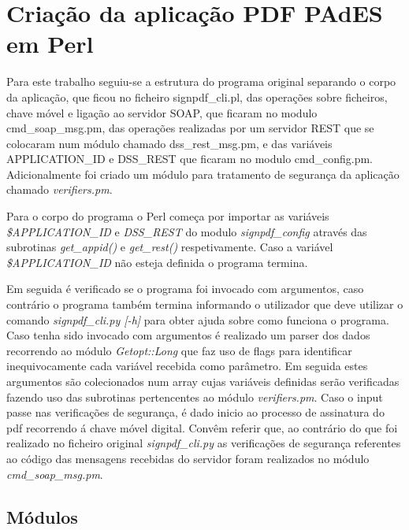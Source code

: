 \section{Criação da aplicação PDF PAdES em Perl}

Para este trabalho seguiu-se a estrutura do programa original separando o corpo da aplicação, que ficou no ficheiro signpdf\_cli.pl, das operações sobre ficheiros, chave móvel e ligação ao servidor SOAP, que ficaram no modulo cmd\_soap\_msg.pm, das operações realizadas por um servidor REST que se colocaram num módulo chamado dss\_rest\_msg.pm, e das variáveis APPLICATION\_ID e DSS\_REST que ficaram no modulo cmd\_config.pm. Adicionalmente foi criado um módulo para tratamento de segurança da aplicação chamado \textit{verifiers.pm}.\newline


Para o corpo do programa o Perl começa por importar as variáveis \textit{\$APPLICATION\_ID} e \textit{DSS\_REST} do modulo \textit{signpdf\_config} através das subrotinas \textit{get\_appid()} e \textit{get\_rest()} respetivamente. Caso a variável \textit{\$APPLICATION\_ID} não esteja definida o programa termina. \newline

Em seguida é verificado se o programa foi invocado com argumentos, caso contrário o programa também termina informando o utilizador que deve utilizar o comando \textit{signpdf\_cli.py [-h]} para obter ajuda sobre como funciona o programa. Caso tenha sido invocado com argumentos é realizado um parser dos dados recorrendo ao módulo \textit{Getopt::Long} que faz uso de flags para identificar inequivocamente cada variável recebida como parâmetro. Em seguida estes argumentos são colecionados num array cujas variáveis definidas serão verificadas fazendo uso das subrotinas pertencentes ao módulo \textit{verifiers.pm}.\newline
Caso o input passe nas verificações de segurança, é dado inicio ao processo de assinatura do pdf recorrendo á chave móvel digital.\newline
Convêm referir que, ao contrário do que foi realizado no ficheiro original \textit{signpdf\_cli.py} as verificações de segurança referentes ao código das mensagens recebidas do servidor foram realizados no módulo \textit{cmd\_soap\_msg.pm}.

\subsection{Módulos}

